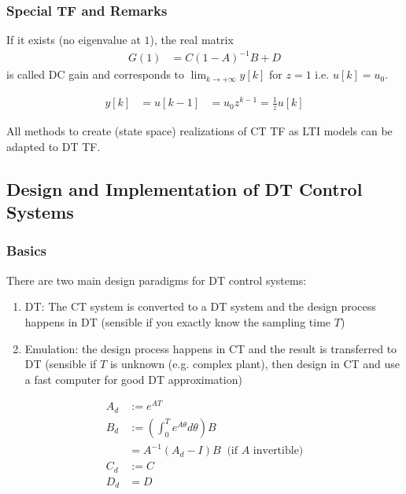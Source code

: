 \subsubsection{Special TF and Remarks}

If it exists (no eigenvalue at $1$), the real matrix
\noindent\begin{align*}
    G(1) & =C(1-A)^{-1}B+D
\end{align*}
is called DC gain and corresponds to $\lim_{k\to+\infty}y[k]$ for $z=1$ i.e. $u[k]=u_0$.\\
%

\noindent\begin{align*}
    y[k] & =u[k-1] & =u_0z^{k-1}=\frac1zu[k]
\end{align*}

All methods to create (state space) realizations of CT TF as LTI models can be adapted to DT TF.
%
%
\newpage
\subsection{Design and Implementation of DT Control Systems}
\subsubsection{Basics}
There are two main design paradigms for DT control systems:
\begin{enumerate}
    \item DT: The CT system is converted to a DT system and the design process happens in DT (sensible if you exactly know the sampling time $T$)
    \item Emulation: the design process happens in CT and the result is transferred to DT (sensible if $T$ is unknown (e.g. complex plant), then design in CT and use a fast computer for good DT approximation)
\end{enumerate}

\noindent\begin{align*}
    A_d & :=e^{AT}                                                   \\
    B_d & :=\left(\int_0^T {e^{A\theta}}d\theta\right)B              \\
        & = A^{-1}\left(A_d-I\right)B\;\; \text{(if $A$ invertible)} \\
    C_d & :=C                                                        \\
    D_d & =D                                                         \\
\end{align*}

